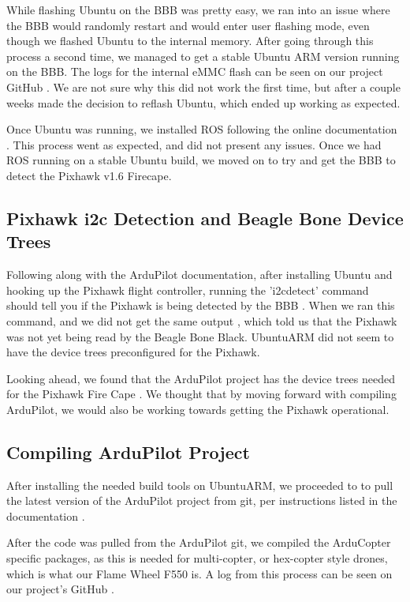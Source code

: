 \documentclass[IEEEtran,letterpaper,10pt,notitlepage,draftclsnofoot]{article}
\begin{document}
While flashing Ubuntu on the BBB was pretty easy, we ran into an issue where the BBB would randomly restart
and would enter user flashing mode, even though we flashed Ubuntu to the internal memory. After going through
this process a second time, we managed to get a stable Ubuntu ARM version running on the BBB. The logs for
the internal eMMC flash can be seen on our project GitHub \cite{eMMCLog}. We are not
sure why this did not work the first time, but after a couple weeks made the decision to reflash Ubuntu,
which ended up working as expected.

Once Ubuntu was running, we installed ROS following the online documentation \cite{ROSUbuntuARM}. This process went as expected, and did not present any issues. Once we had ROS running on a stable
Ubuntu build, we moved on to try and get the BBB to detect the Pixhawk v1.6 Firecape.


\subsection{Pixhawk i2c Detection and Beagle Bone Device Trees}

Following along with the ArduPilot documentation, after installing Ubuntu and hooking up the Pixhawk
flight controller, running the 'i2cdetect' command should tell you if the Pixhawk is being detected
by the BBB \cite{PixhawkDetectionArdu}.
When we ran this command, and we did not get the same output \cite{PixhawkDetectLog}, which
told us that the Pixhawk was not yet being read by the Beagle Bone Black. UbuntuARM did not seem to have the
device trees preconfigured for the Pixhawk.

Looking ahead, we found that the ArduPilot project has the device trees needed for the Pixhawk Fire Cape
\cite{ArduGuideDeviceTrees}. We thought that by moving forward with compiling ArduPilot, we would also be working towards getting the Pixhawk operational.


\subsection{Compiling ArduPilot Project}

After installing the needed build tools on UbuntuARM, we proceeded to to pull the latest version of the
ArduPilot project from git, per instructions listed in the documentation \cite{ArduCompileBBB}.

After the code was pulled from the ArduPilot git, we compiled the ArduCopter specific packages, as this is
needed for multi-copter, or hex-copter style drones, which is what our Flame Wheel F550 is. A log from this process can be
seen on our project's GitHub \cite{ArduCompileLog}.
\end{document}
